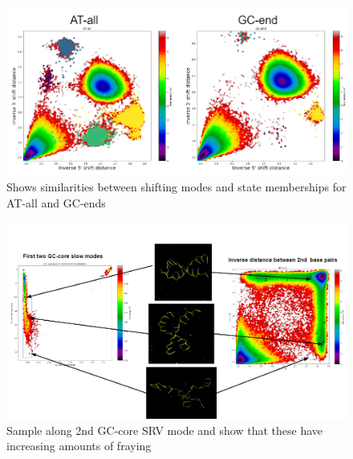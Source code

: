 \documentclass[journal=jpcbfk,manuscript=article]{achemso}
\begin{document}
\begin{figure}[ht!]
	\begin{center}
        \includegraphics[width=\textwidth]{Figs/skeleton/shifting_distribution.PNG}
        \caption{Shows similarities between shifting modes and state memberships for AT-all and GC-ends}
        \label{fig:shifting_distributions}
	\end{center}
\end{figure}

\begin{figure}[ht!]
	\begin{center}
        \includegraphics[width=\textwidth]{Figs/skeleton/sample_fray.PNG}
        \caption{Sample along 2nd GC-core SRV mode and show that these have increasing amounts of fraying}
        \label{fig:sample_fray}
	\end{center}
\end{figure}
\end{document}
